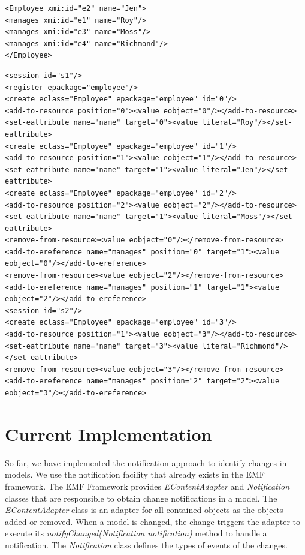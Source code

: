 \documentclass{llncs}
\begin{document}
\begin{lstlisting}[style=xmi,caption={State-based representation of the model of Figure \ref{image2} in (simplified) XMI.},label=xmimodel]
<Employee xmi:id="e2" name="Jen">
<manages xmi:id="e1" name="Roy"/>
<manages xmi:id="e3" name="Moss"/>
<manages xmi:id="e4" name="Richmond"/>
</Employee>
\end{lstlisting}

\begin{lstlisting}[style=xml,caption={Change-based representation of the model of Figure \ref{image2}.},label=cbpmodel1]
<session id="s1"/>
<register epackage="employee"/>
<create eclass="Employee" epackage="employee" id="0"/>
<add-to-resource position="0"><value eobject="0"/></add-to-resource>
<set-eattribute name="name" target="0"><value literal="Roy"/></set-eattribute>
<create eclass="Employee" epackage="employee" id="1"/>
<add-to-resource position="1"><value eobject="1"/></add-to-resource>
<set-eattribute name="name" target="1"><value literal="Jen"/></set-eattribute>
<create eclass="Employee" epackage="employee" id="2"/>
<add-to-resource position="2"><value eobject="2"/></add-to-resource>
<set-eattribute name="name" target="1"><value literal="Moss"/></set-eattribute>
<remove-from-resource><value eobject="0"/></remove-from-resource>
<add-to-ereference name="manages" position="0" target="1"><value eobject="0"/></add-to-ereference>
<remove-from-resource><value eobject="2"/></remove-from-resource>
<add-to-ereference name="manages" position="1" target="1"><value eobject="2"/></add-to-ereference>
<session id="s2"/>
<create eclass="Employee" epackage="employee" id="3"/>
<add-to-resource position="1"><value eobject="3"/></add-to-resource>
<set-eattribute name="name" target="3"><value literal="Richmond"/></set-eattribute>
<remove-from-resource><value eobject="3"/></remove-from-resource>
<add-to-ereference name="manages" position="2" target="2"><value eobject="3"/></add-to-ereference>
\end{lstlisting}

\section{Current Implementation}
\label{Current Implementation}
So far, we have implemented the notification approach to identify changes in models. We use the notification facility that already exists in the EMF framework. The EMF Framework provides \emph{EContentAdapter} and \emph{Notification} classes that are responsible to obtain change notifications in a model. The \emph{EContentAdapter} class is an adapter for all contained objects as the objects added or removed. When a model is changed, the change triggers the adapter to execute its \emph{notifyChanged(Notification notification)} method to handle a notification. The \emph{Notification} class defines the types of events of the changes.
\end{document}

